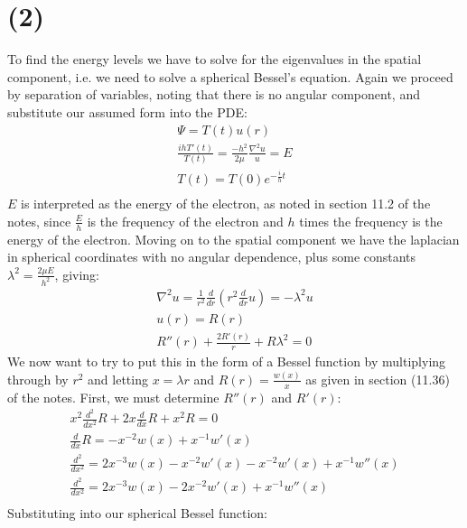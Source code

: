 \documentclass{article}
\begin{document}
\section*{\textbf{(2)}}
To find the energy levels we have to solve for the eigenvalues in the spatial component, i.e. we need to solve a spherical Bessel's equation. Again we proceed by separation of variables, noting that there is no angular component, and substitute our assumed form into the PDE:
\begin{equation}
\begin{aligned}
\Psi = T(t)u(r)\\
\frac{ihT'(t)}{T(t)} = \frac{-h^2}{2\mu}\frac{\nabla^2u}{u} = E\\
T(t) = T(0)e^{-\frac{i}{h}t}\\
\end{aligned}
\end{equation}
$E$ is interpreted as the energy of the electron, as noted in section 11.2 of the notes, since $\frac{E}{h}$ is the frequency of the electron and $h$ times the frequency is the energy of the electron. Moving on to the spatial component we have the laplacian in spherical coordinates with no angular dependence, plus some constants $\lambda^2 = \frac{2\mu E}{h^2}$, giving:
\begin{equation}
\begin{aligned}
\nabla^2u = \frac{1}{r^2}\frac{d}{dr}(r^2\frac{d}{dr}u) = -\lambda^2u\\
u(r) = R(r)\\
R''(r) + \frac{2R'(r)}{r} + R\lambda^2 = 0
\end{aligned}
\end{equation}
We now want to try to put this in the form of a Bessel function by multiplying through by $r^2$ and letting $x=\lambda r$ and $R(r) = \frac{w(x)}{x}$ as given in section (11.36) of the notes. First, we must determine $R''(r)$ and $R'(r)$:
\begin{equation}
\begin{aligned}
x^2\frac{d^2}{dx^2}R + 2x\frac{d}{dx}R + x^2R = 0\\
\frac{d}{dx}R = -x^{-2}w(x) + x^{-1}{w'(x)}\\
\frac{d^2}{dx^2} = 2x^{-3}w(x) - x^{-2}w'(x) - x^{-2}w'(x) + x^{-1}w''(x)\\
\frac{d^2}{dx^2} = 2x^{-3}w(x) - 2x^{-2}w'(x) + x^{-1}w''(x)\\
\end{aligned}
\end{equation}
Substituting into our spherical Bessel function:
\end{document}
